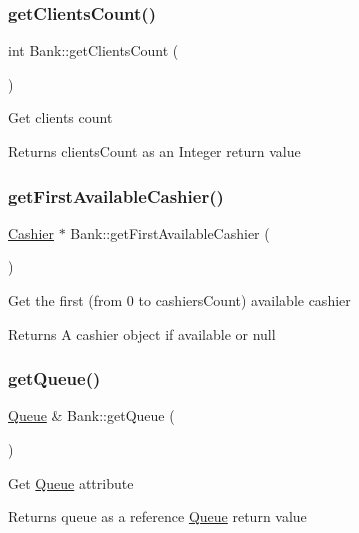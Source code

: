 \subsubsection{\texorpdfstring{get\+Clients\+Count()}{getClientsCount()}}
{\footnotesize\ttfamily int Bank\+::get\+Clients\+Count (\begin{DoxyParamCaption}{ }\end{DoxyParamCaption})}

Get clients count \begin{DoxyReturn}{Returns}
clients\+Count as an Integer return value 
\end{DoxyReturn}
\mbox{\label{classBank_a406e1fc9b050ed4559760c5a52fe81e4}} 
\subsubsection{\texorpdfstring{get\+First\+Available\+Cashier()}{getFirstAvailableCashier()}}
{\footnotesize\ttfamily \hyperlink{classCashier}{Cashier} $\ast$ Bank\+::get\+First\+Available\+Cashier (\begin{DoxyParamCaption}{ }\end{DoxyParamCaption})}

Get the first (from 0 to cashiers\+Count) available cashier \begin{DoxyReturn}{Returns}
A cashier object if available or null 
\end{DoxyReturn}
\mbox{\label{classBank_a79644f520ee9fafdfa1ffa303b84bb4a}} 
\subsubsection{\texorpdfstring{get\+Queue()}{getQueue()}}
{\footnotesize\ttfamily \hyperlink{classQueue}{Queue} \& Bank\+::get\+Queue (\begin{DoxyParamCaption}{ }\end{DoxyParamCaption})}

Get \hyperlink{classQueue}{Queue} attribute \begin{DoxyReturn}{Returns}
queue as a reference \hyperlink{classQueue}{Queue} return value 
\end{DoxyReturn}
\mbox{\label{classBank_a8d181c1cfdea6b987602f9e2954cb7ad}} 

